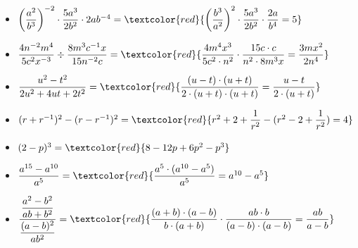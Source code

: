 \documentclass[11pt, a4paper, twoside, fleqn]{article}
\begin{document}
\begin{itemize}[itemsep=3ex, leftmargin=*]
\item $ \left(\dfrac{a^{2}}{b^{3}} \right)^{-2} \cdot \dfrac{5a^{3}}{2b^{2}} \cdot 2ab^{-4} = \textcolor{red}{\left(\dfrac{b^{3}}{a^2}\right)^{2} \cdot \dfrac{5a^3}{2b^2} \cdot \dfrac{2a}{b^{4}} = 5} $
\item $ \dfrac{4n^{-2} m^{4}}{5c^{2} x^{-3}} \div \dfrac{8m^{3}c^{-1}x}{15n^{-2}c} =\textcolor{red}{\dfrac{4m^{4}x^{3}}{5c^{2} \cdot n^{2}} \cdot \dfrac{15c \cdot c }{n^{2} \cdot 8m^{3}x} = \dfrac{3mx^{2}}{2n^{4}}} $
\item $ \dfrac{u^{2} - t^{2}}{2u^{2} + 4ut + 2t^{2}} = \textcolor{red}{\dfrac{(u-t) \cdot (u+t)}{2 \cdot (u+t) \cdot (u+t)} = \dfrac{u-t}{2 \cdot (u+t)}} $
\item $ (r+r^{-1})^2 - (r-r^{-1})^2 = \textcolor{red}{r^{2} + 2 + \dfrac{1}{r^{2}} - (r^{2} -2 + \dfrac{1}{r^{2}}) = 4} $
\item $ (2-p)^{3} = \textcolor{red}{8-12p+6p^{2}-p^3} $
\item $ \dfrac{a^{15} - a^{10}} {a^{5}} = \textcolor{red}{\dfrac{a^{5} \cdot (a^{10} - a^{5})}{a^{5}} = a^{10} - a^{5}} $
\item $ \dfrac{\dfrac{a^{2} - b^{2}}{ab + b^{2}}}{\dfrac{(a-b)^{2}}{ab^{2}}} = \textcolor{red}{\dfrac{(a+b) \cdot (a-b)}{b \cdot (a+b)} \cdot \dfrac{ab \cdot b}{(a-b) \cdot (a-b)} = \dfrac{ab}{a-b}}$ 
\end{itemize}
\newpage
\end{document}

